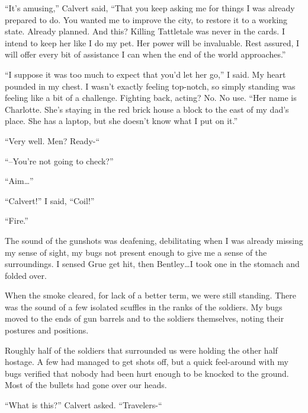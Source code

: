 ``It's amusing,'' Calvert said, ``That you keep asking me for things I was already prepared to do.  You wanted me to improve the city, to restore it to a working state.  Already planned.  And this?  Killing Tattletale was never in the cards.  I intend to keep her like I do my pet.  Her power will be invaluable.  Rest assured, I will offer every bit of assistance I can when the end of the world approaches.''



``I suppose it was too much to expect that you'd let her go,'' I said.  My heart pounded in my chest.  I wasn't exactly feeling top-notch, so simply standing was feeling like a bit of a challenge.  Fighting back, acting?  No.  No use.  ``Her name is Charlotte.  She's staying in the red brick house a block to the east of my dad's place.  She has a laptop, but she doesn't know what I put on it.''



``Very well.  Men?  Ready-``



``--You're not going to check?''



``Aim\ldots''



``Calvert!'' I said, ``Coil!''



``Fire.''



The sound of the gunshots was deafening, debilitating when I was already missing my sense of sight, my bugs not present enough to give me a sense of the surroundings.  I sensed Grue get hit, then Bentley\ldots I took one in the stomach and folded over.



When the smoke cleared, for lack of a better term, we were still standing.  There was the sound of a few isolated scuffles in the ranks of the soldiers.  My bugs moved to the ends of gun barrels and to the soldiers themselves, noting their postures and positions.



Roughly half of the soldiers that surrounded us were holding the other half hostage.  A few had managed to get shots off, but a quick feel-around with my bugs verified that nobody had been hurt enough to be knocked to the ground.  Most of the bullets had gone over our heads.



``What is this?'' Calvert asked.  ``Travelers-``



